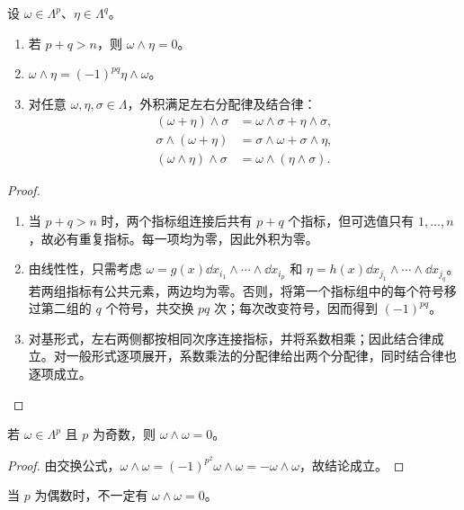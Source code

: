 \begin{proposition}[外积的性质]
设 $\omega\in\Lambda^p$、$\eta\in\Lambda^q$。
\begin{enumerate}
\item 若 $p+q>n$，则 $\omega\wedge\eta=0$。
\item $\omega\wedge\eta=(-1)^{pq}\eta\wedge\omega$。
\item 对任意 $\omega,\eta,\sigma\in\Lambda$，外积满足左右分配律及结合律：
\[
\begin{aligned}
(\omega+\eta)\wedge\sigma&=\omega\wedge\sigma+\eta\wedge\sigma,\\
\sigma\wedge(\omega+\eta)&=\sigma\wedge\omega+\sigma\wedge\eta,\\
(\omega\wedge\eta)\wedge\sigma&=\omega\wedge(\eta\wedge\sigma).
\end{aligned}
\]
\end{enumerate}
\end{proposition}
\begin{proof}
\begin{enumerate}
\item 当 $p+q>n$ 时，两个指标组连接后共有 $p+q$ 个指标，但可选值只有 $1,\ldots,n$，故必有重复指标。每一项均为零，因此外积为零。
\item 由线性性，只需考虑 $\omega=g(x)\dd x_{i_1}\wedge\cdots\wedge\dd x_{i_p}$ 和 $\eta=h(x)\dd x_{j_1}\wedge\cdots\wedge\dd x_{j_q}$。若两组指标有公共元素，两边均为零。否则，将第一个指标组中的每个符号移过第二组的 $q$ 个符号，共交换 $pq$ 次；每次改变符号，因而得到 $(-1)^{pq}$。
\item 对基形式，左右两侧都按相同次序连接指标，并将系数相乘；因此结合律成立。对一般形式逐项展开，系数乘法的分配律给出两个分配律，同时结合律也逐项成立。
\end{enumerate}
\end{proof}

\begin{corollary}
若 $\omega\in\Lambda^p$ 且 $p$ 为奇数，则 $\omega\wedge\omega=0$。
\end{corollary}
\begin{proof}
由交换公式，$\omega\wedge\omega=(-1)^{p^2}\omega\wedge\omega=-\omega\wedge\omega$，故结论成立。
\end{proof}

当 $p$ 为偶数时，不一定有 $\omega\wedge\omega=0$。

